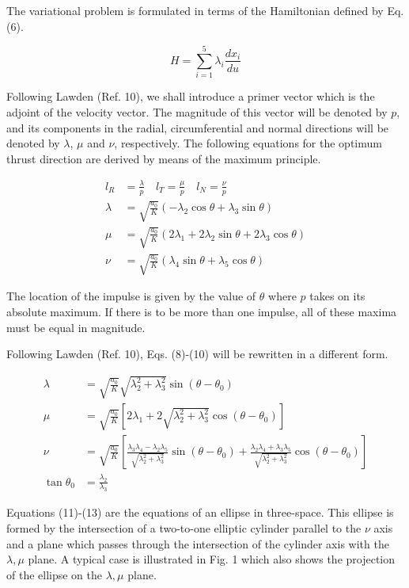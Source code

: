 \documentclass[12pt]{article}
\begin{document}
The variational problem is formulated in terms of the Hamiltonian defined by Eq. (6).

\[
H = \sum_{i=1}^{5} \lambda_i \frac{dx_i}{du} \tag{6}
\]

Following Lawden (Ref. 10), we shall introduce a primer vector which is the adjoint of the velocity vector. The magnitude of this vector will be denoted by $ p $, and its components in the radial, circumferential and normal directions will be denoted by $ \lambda $, $ \mu $ and $ \nu $, respectively. The following equations for the optimum thrust direction are derived by means of the maximum principle.

\begin{align}
l_R &= \frac{\lambda}{p} \quad l_T = \frac{\mu}{p} \quad l_N = \frac{\nu}{p} \tag{7} \\
\lambda &= \sqrt{\frac{a_0}{K}} \left( -\lambda_2 \cos \theta + \lambda_3 \sin \theta \right) \tag{8} \\
\mu &= \sqrt{\frac{a_0}{K}} \left( 2\lambda_1 + 2\lambda_2 \sin \theta + 2\lambda_3 \cos \theta \right) \tag{9} \\
\nu &= \sqrt{\frac{a_0}{K}} \left( \lambda_4 \sin \theta + \lambda_5 \cos \theta \right) \tag{10}
\end{align}

The location of the impulse is given by the value of $ \theta $ where $ p $ takes on its absolute maximum. If there is to be more than one impulse, all of these maxima must be equal in magnitude.

Following Lawden (Ref. 10), Eqs. (8)-(10) will be rewritten in a different form.

\begin{align}
\lambda &= \sqrt{\frac{a_0}{K}} \sqrt{\lambda_2^2 + \lambda_3^2} \sin (\theta - \theta_0) \tag{11} \\
\mu &= \sqrt{\frac{a_0}{K}} \left[ 2 \lambda_1 + 2 \sqrt{\lambda_2^2 + \lambda_3^2} \cos (\theta - \theta_0) \right] \tag{12} \\
\nu &= \sqrt{\frac{a_0}{K}} \left[ \frac{\lambda_3 \lambda_4 - \lambda_2 \lambda_5}{\sqrt{\lambda_2^2 + \lambda_3^2}} \sin (\theta - \theta_0) + \frac{\lambda_2 \lambda_4 + \lambda_3 \lambda_5}{\sqrt{\lambda_2^2 + \lambda_3^2}} \cos (\theta - \theta_0) \right] \tag{13} \\
\tan \theta_0 &= \frac{\lambda_2}{\lambda_3} \tag{14}
\end{align}

Equations (11)-(13) are the equations of an ellipse in three-space. This ellipse is formed by the intersection of a two-to-one elliptic cylinder parallel to the $\nu$ axis and a plane which passes through the intersection of the cylinder axis with the $\lambda, \mu$ plane. A typical case is illustrated in Fig. 1 which also shows the projection of the ellipse on the $\lambda, \mu$ plane.
\end{document}
